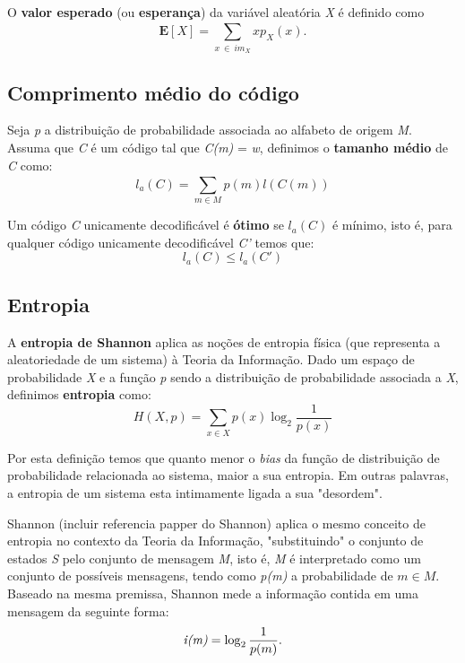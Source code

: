 O \textbf{valor esperado} (ou \textbf{esperança}) da variável aleatória \emph{X} é definido como
\begin{equation} \label{eq:exp_val}
\textbf{E}[X] = \sum_{x ~\in ~im_X}^{} xp_X(x).
\end{equation}
\subsection{Comprimento médio do código}
Seja \emph{p} a distribuição de probabilidade associada ao alfabeto de origem \emph{M}. Assuma que \emph{C} é um código tal que \emph{C(m)} = \emph{w}, definimos o \textbf{tamanho médio} de \emph{C} como:
\begin{equation} \label{eq:code_len}
l_a (C) = \sum_{m \in M}^{} p(m) l(C(m))
\end{equation}

Um código \emph{C} unicamente decodificável é \textbf{ótimo} se $l_a(C)$ é mínimo, isto é, para qualquer código unicamente decodificável \emph{C'} temos que:
\begin{equation} \label{eq:code_len_optimal}
l_a(C) \leq l_a(C')
\end{equation}

\subsection{Entropia}
A \textbf{entropia de Shannon} aplica as noções de entropia física (que representa a aleatoriedade de um sistema) à Teoria da Informação. Dado um espaço de probabilidade \emph{X} e a função \emph{p} sendo a distribuição de probabilidade associada a \emph{X}, definimos \textbf{entropia} como:
\begin{equation} \label{eq:entropy}
H(X, p) = \sum_{x \in X}^{} p(x) \log_2 \frac{1}{p(x)}
\end{equation}

Por esta definição temos que quanto menor o \emph{bias} da função de distribuição de probabilidade relacionada ao sistema, maior a sua entropia. Em outras palavras, a entropia de um sistema esta intimamente ligada a sua  "desordem". 

Shannon (incluir referencia papper do Shannon) aplica o mesmo conceito de entropia no contexto da Teoria da Informação, "substituindo" o conjunto de estados \emph{S} pelo conjunto de mensagem \emph{M}, isto é, \emph{M} é interpretado como um conjunto de possíveis mensagens, tendo como \emph{p(m)} a probabilidade de $m \in M$.
Baseado na mesma premissa, Shannon mede a informação contida em uma mensagem da seguinte forma:
\begin{equation} \label{label:info_quantity}
\emph{i(m)} = \log_2 \frac{1}{p(m)}.
\end{equation}


